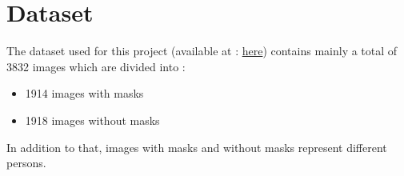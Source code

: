 \section{Dataset}
\begin{flushleft}

The dataset used for this project (available at : \href{https://drive.google.com/file/d/1HzrqJLkGG8TUaP1N_QkB7uaf-dtcB35H/view}{here}) contains mainly a total of 3832 images which are divided into :
\begin{itemize}
    \item 1914 images with masks
    \item 1918 images without masks
\end{itemize}

In addition to that, images with masks and without masks represent different persons.
\end{flushleft}
